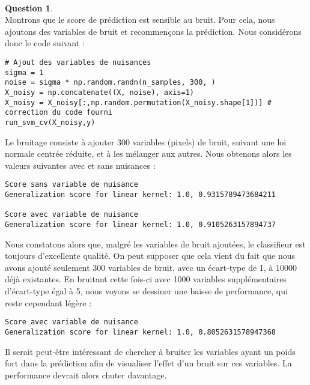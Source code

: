 \documentclass[11pt,a4paper]{article}
\theoremstyle{definition}
\newtheorem{Qu}{Question}
\begin{document}
\

\begin{Qu}~\\

Montrons que le score de prédiction est sensible au bruit. Pour cela, nous ajoutons des variables de bruit et recommençons la prédiction. 
Nous considérons donc le code suivant : 

\begin{verbatim}
# Ajout des variables de nuisances
sigma = 1
noise = sigma * np.random.randn(n_samples, 300, )
X_noisy = np.concatenate((X, noise), axis=1)
X_noisy = X_noisy[:,np.random.permutation(X_noisy.shape[1])] # correction du code fourni
run_svm_cv(X_noisy,y)
\end{verbatim}

Le bruitage consiste à ajouter 300 variables (pixels) de bruit, suivant une loi normale centrée réduite, et à les mélanger aux autres. Nous obtenons alors les valeurs suivantes avec et sans nuisances :

\begin{verbatim}
Score sans variable de nuisance
Generalization score for linear kernel: 1.0, 0.9315789473684211

Score avec variable de nuisance
Generalization score for linear kernel: 1.0, 0.9105263157894737
\end{verbatim}


Nous constatons alors que, malgré les variables de bruit ajoutées, le classifieur est toujours d'excellente qualité. On peut supposer que cela vient du fait que nous avons ajouté seulement 300 variables de bruit, avec un écart-type de 1, à 10000 déjà existantes. 
En bruitant cette fois-ci avec 1000 variables supplémentaires d'écart-type égal à 5, nous voyons se dessiner une baisse de performance, qui reste cependant légère :

\begin{verbatim}
Score avec variable de nuisance
Generalization score for linear kernel: 1.0, 0.8052631578947368 
\end{verbatim}

Il serait peut-être intéressant de chercher à bruiter les variables ayant un poids fort dans la prédiction afin de visualiser l'effet d'un bruit sur ces variables. La performance devrait alors chuter davantage. 



\end{Qu}

\
\end{document}
